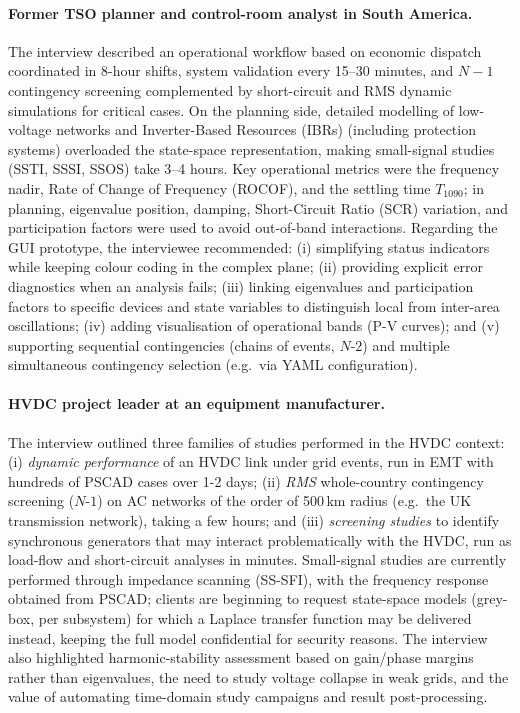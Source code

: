 \paragraph{Former TSO planner and control-room analyst in South America.} The interview described an operational workflow based on economic dispatch coordinated in 8-hour shifts, system validation every 15--30 minutes, and \mbox{$N-1$} contingency screening complemented by short-circuit and RMS dynamic simulations for critical cases. On the planning side, detailed modelling of low-voltage networks and Inverter-Based Resources (IBRs) (including protection systems) overloaded the state-space representation, making small-signal studies (SSTI, SSSI, SSOS) take 3--4 hours. Key operational metrics were the frequency nadir, Rate of Change of Frequency (ROCOF), and the settling time $T_{1090}$; in planning, eigenvalue position, damping, Short-Circuit Ratio (SCR) variation, and participation factors were used to avoid out-of-band interactions. Regarding the GUI prototype, the interviewee recommended: (i) simplifying status indicators while keeping colour coding in the complex plane; (ii) providing explicit error diagnostics when an analysis fails; (iii) linking eigenvalues and participation factors to specific devices and state variables to distinguish local from inter-area oscillations; (iv) adding visualisation of operational bands (P-V curves); and (v) supporting sequential contingencies (chains of events, $N$-$2$) and multiple simultaneous contingency selection (e.g.\ via YAML configuration).

\paragraph{HVDC project leader at an equipment manufacturer.} The interview outlined three families of studies performed in the HVDC context: (i) \emph{dynamic performance} of an HVDC link under grid events, run in EMT with hundreds of PSCAD cases over 1-2 days; (ii) \emph{RMS} whole-country contingency screening ($N$-$1$) on AC networks of the order of 500\,km radius (e.g.\ the UK transmission network), taking a few hours; and (iii) \emph{screening studies} to identify synchronous generators that may interact problematically with the HVDC, run as load-flow and short-circuit analyses in minutes. Small-signal studies are currently performed through impedance scanning (SS-SFI), with the frequency response obtained from PSCAD; clients are beginning to request state-space models (grey-box, per subsystem) for which a Laplace transfer function may be delivered instead, keeping the full model confidential for security reasons. The interview also highlighted harmonic-stability assessment based on gain/phase margins rather than eigenvalues, the need to study voltage collapse in weak grids, and the value of automating time-domain study campaigns and result post-processing.

